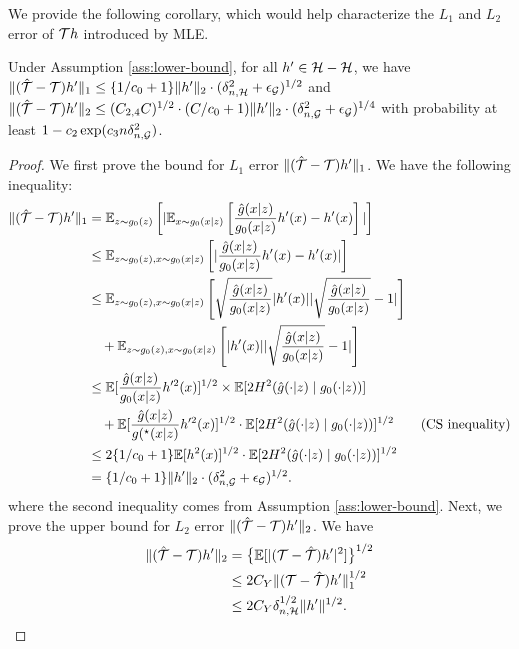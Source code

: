 We provide the following corollary, which would help characterize the $L_1$ and $L_2$ error of ${\mathcal{T}} h$ introduced by MLE.
\begin{corollary}\label{cor: T-mle}
Under Assumption \ref{ass:lower-bound}, for all $h' \in\mathcal{H} - \mathcal{H}$, we have $\|(\hat {{\mathcal{T}}}-{\mathcal{T}})h'\|_1 \leq \{1/c_0+1\} \|h'\|_2 \cdot (\delta_{n,\mathcal{H}}^2 + \epsilon_{\mathcal{G}})^{1/2}$ and $\|(\hat {{\mathcal{T}}}-{\mathcal{T}})h'\|_2 \leq (C_{2,4}C)^{1/2}\cdot (C/c_0 +1)\|h'\|_{2}\cdot (\delta_{n,\mathcal{G}}^2 + \epsilon_{\mathcal{G}})^{1/4}$
     with probability at least $1 - c_2\exp(c_3 n\delta_{n,\mathcal{G}}^2 )$.
\end{corollary}
\begin{proof}
We first prove the bound for $L_1$ error $\|(\hat {{\mathcal{T}}}-{\mathcal{T}})h'\|_1$. We have the following inequality:
\begin{align*}
    \|(\hat {{\mathcal{T}}}-{\mathcal{T}})h'\|_1 &= \mathbb{E}_{z \sim g_0(z)}\left[|\mathbb{E}_{x \sim g_0(x|z)}\left [\frac{\hat g(x|z)}{g_0(x|z)}h'(x) - h'(x) \right] | \right]\\
    &\leq \mathbb{E}_{z \sim g_0(z),x \sim g_0(x|z)}\left[ |\frac{\hat g(x|z)}{g_0(x|z)}h'(x) - h'(x)  | \right]\\
    &\leq \mathbb{E}_{z \sim g_0(z),x \sim g_0(x|z)}\left[\sqrt{\frac{\hat g(x|z)}{g_0(x|z)}}|h'(x)| |\sqrt{\frac{\hat g(x|z)}{g_0(x|z)}} - 1 |\right]\\
    &\quad + \mathbb{E}_{z \sim g_0(z),x \sim g_0(x|z)}\left[|h'(x)||\sqrt{\frac{\hat g(x|z)}{g_0(x|z)}} - 1  |\right] \\
    &\leq \mathbb{E}[\frac{\hat g(x|z)}{g_0(x|z)}h'^2(x) ]^{1/2} \times \mathbb{E}[2H^2(\hat g(\cdot|z)\mid g_0(\cdot |z))  ] \\
    &\quad +\mathbb{E}[\frac{\hat g(x|z)}{g(^{\star}(x|z)}h'^2(x) ]^{1/2} \cdot \mathbb{E}[2H^2(\hat g(\cdot|z)\mid g_0(\cdot |z))  ]^{1/2} \tag{CS inequality} \\
    &\leq  2\{1/c_0+1\} \mathbb{E}[h^2(x) ]^{1/2} \cdot \mathbb{E}[2H^2(\hat g(\cdot|z)\mid g_0(\cdot |z))  ]^{1/2}\\
    & = \{1/c_0+1\} \|h'\|_2 \cdot (\delta_{n,\mathcal{G}}^2 + \epsilon_{\mathcal{G}})^{1/2}.
\end{align*}
where the second inequality comes from Assumption \ref{ass:lower-bound}.
Next, we prove the upper bound for $L_2$ error $\|(\hat {{\mathcal{T}}}-{\mathcal{T}})h'\|_2$. We have 
\begin{align*}
    \|(\hat \Tcal-\Tcal)h'\|_2 &= \big\{\E[|(\Tcal - \hat{\Tcal})h'|^2]\big\}^{1/2}\\
    &\leq 2C_Y \|(\Tcal - \hat{\Tcal})h'\|_1^{1/2}\\
    &\leq 2C_Y \delta_{n,\Hcal}^{1/2} \|h'\|^{1/2}.

\end{align*}
\end{proof}
